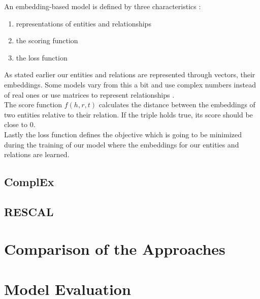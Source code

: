 An embedding-based model is defined by three characteristics \cite{bianchi_knowledge_2021}:

\begin{enumerate}
\item representations of entities and relationships
\item the scoring function
\item the loss function
\end{enumerate}

As stated earlier our entities and relations are represented through vectors, their embeddings. Some models vary from this a bit and use complex numbers instead of real ones \cite{trouillon_complex_2016}  or use matrices to represent relationships \cite{nickel_three-way_2011}.
\\
The score function $f(h,r,t)$ calculates the distance between the embeddings of two entities relative to their relation. If the triple holds true, its score should be close to $0$. \\
Lastly the loss function defines the objective which is going to be minimized during the training of our model where the embeddings for our entities and relations are learned.

\subsection{ComplEx}
\label{cha:complex}
\subsection{RESCAL}

\section{Comparison of the Approaches}
\label{cha:compare_approaches}

\section{Model Evaluation}
\label{cha:evaluation}